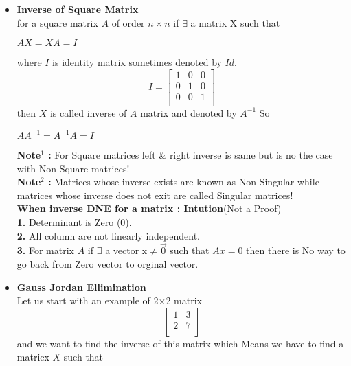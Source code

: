 \documentclass[a4paper,11pt]{article}
\numberwithin{equation}{section}
\begin{document}
\begin{itemize}
    \item \textbf{Inverse of Square Matrix}\\
        for a square matrix $A$ of order $n \times n$ if $\exists$ a matrix X such that
        \begin{center}
            $AX=XA=I$
        \end{center}
        where $I$ is identity matrix sometimes denoted by $Id$.
        \begin{equation}
            I=
            \begin{bmatrix}
                1 & 0 & 0\\
                0 & 1 & 0\\
                0 & 0 & 1\\
            \end{bmatrix}
        \end{equation}
    then $X$ is called inverse of $A$ matrix and denoted by $A^{-1}$ So
    \begin{center}
        $AA^{-1}=A^{-1}A=I$
    \end{center}
    \textbf{Note$^1$ : }For Square matrices left \& right inverse is same but is no the case with Non-Square matrices!\\
    \textbf{Note$^2$ : }Matrices whose inverse exists are known as Non-Singular while matrices whose inverse does not exit are called Singular matrices!\\
    
    \textbf{When inverse DNE for a matrix : Intution}(Not a Proof)\\ 
    
    \textbf{1.} Determinant is Zero ($0$).\\
    \textbf{2.} All column are not linearly independent.\\
    \textbf{3.} For matrix $A$ if $ \exists$ a vector x$\neq \vec{0}$ such that $Ax=0$
    then there is No way to go back from Zero vector to orginal vector.\\

    \item \textbf{Gauss Jordan Ellimination}\\
        Let us start with an example of 2$\times$2 matrix
        \begin{equation}
                \begin{bmatrix}
                    1 & 3\\
                    2 & 7 \\
                \end{bmatrix}
        \end{equation}
and we want to find the inverse of this matrix which Means we have to find a matricx $X$ such that 


\end{itemize}
\end{document}
